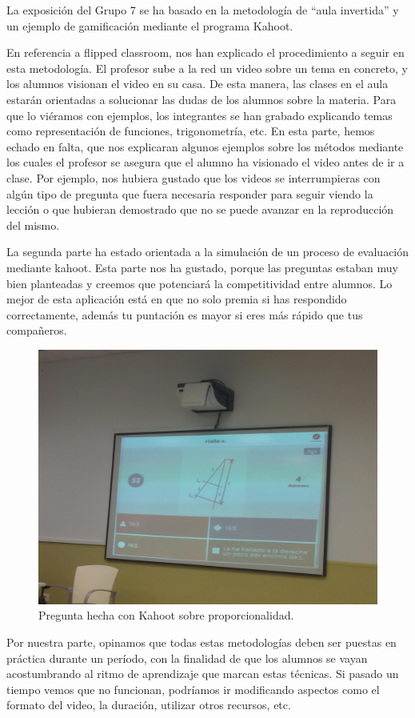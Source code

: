 La exposición del Grupo 7 se ha basado en la metodología de “aula invertida” y un ejemplo de gamificación mediante el programa Kahoot. 

En referencia a flipped classroom, nos han explicado el procedimiento a seguir en esta metodología. El profesor sube a la red un video sobre un tema en concreto, y los alumnos visionan el video en su casa. De esta manera, las clases en el aula estarán orientadas a solucionar las dudas de los alumnos sobre la materia. Para que lo viéramos con ejemplos, los integrantes se han grabado explicando temas como representación de funciones, trigonometría, etc. En esta parte, hemos echado en falta, que nos explicaran algunos ejemplos sobre los métodos mediante los cuales el profesor se asegura que el alumno ha visionado el video antes de ir a clase. Por ejemplo, nos hubiera gustado que los videos se interrumpieras con algún tipo de pregunta que fuera necesaria responder para seguir viendo la lección o que hubieran demostrado que no se puede avanzar en la reproducción del mismo.

La segunda parte ha estado orientada a la simulación de un proceso de evaluación mediante kahoot. Esta parte nos ha gustado, porque las preguntas estaban muy bien planteadas y creemos que potenciará la competitividad entre alumnos. Lo mejor de esta aplicación está en que no solo premia si has respondido correctamente, además tu puntación es mayor si eres más rápido que tus compañeros. 


\begin{figure}[hbt]
\centering
\includegraphics[scale=0.11]{img/grupo7_2.jpg}
\caption{Pregunta hecha con Kahoot sobre proporcionalidad.}
\end{figure}


Por nuestra parte, opinamos que todas estas metodologías deben ser puestas en práctica durante un período, con la finalidad de que los alumnos se vayan acostumbrando al ritmo de aprendizaje que marcan estas técnicas. Si pasado un tiempo vemos que no funcionan, podríamos ir modificando aspectos como el formato del video, la duración, utilizar otros recursos, etc.



